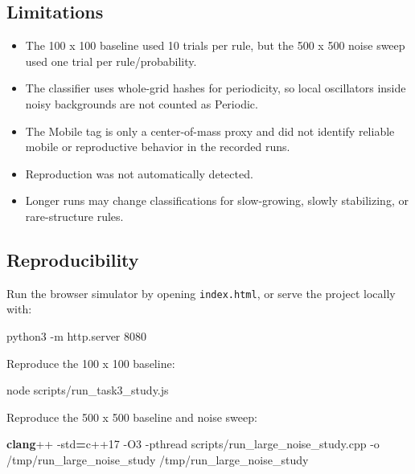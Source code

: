\documentclass[
]{article}
\newenvironment{Shaded}{\begin{snugshade}}{\end{snugshade}}
\newcommand{\AttributeTok}[1]{\textcolor[rgb]{0.13,0.29,0.53}{#1}}
\newcommand{\ExtensionTok}[1]{#1}
\newcommand{\FunctionTok}[1]{\textcolor[rgb]{0.13,0.29,0.53}{\textbf{#1}}}
\newcommand{\NormalTok}[1]{#1}
\newcommand{\OperatorTok}[1]{\textcolor[rgb]{0.81,0.36,0.00}{\textbf{#1}}}
\providecommand{\tightlist}{%
  \setlength{\itemsep}{0pt}\setlength{\parskip}{0pt}}
\begin{document}
\subsection{Limitations}\label{limitations}

\begin{itemize}
\tightlist
\item
  The 100 x 100 baseline used 10 trials per rule, but the 500 x 500
  noise sweep used one trial per rule/probability.
\item
  The classifier uses whole-grid hashes for periodicity, so local
  oscillators inside noisy backgrounds are not counted as Periodic.
\item
  The Mobile tag is only a center-of-mass proxy and did not identify
  reliable mobile or reproductive behavior in the recorded runs.
\item
  Reproduction was not automatically detected.
\item
  Longer runs may change classifications for slow-growing, slowly
  stabilizing, or rare-structure rules.
\end{itemize}

\subsection{Reproducibility}\label{reproducibility}

Run the browser simulator by opening \texttt{index.html}, or serve the
project locally with:

\begin{Shaded}
\begin{Highlighting}[]
\ExtensionTok{python3} \AttributeTok{{-}m}\NormalTok{ http.server 8080}
\end{Highlighting}
\end{Shaded}

Reproduce the 100 x 100 baseline:

\begin{Shaded}
\begin{Highlighting}[]
\ExtensionTok{node}\NormalTok{ scripts/run\_task3\_study.js}
\end{Highlighting}
\end{Shaded}

Reproduce the 500 x 500 baseline and noise sweep:

\begin{Shaded}
\begin{Highlighting}[]
\FunctionTok{clang}\NormalTok{++ }\AttributeTok{{-}std}\OperatorTok{=}\NormalTok{c++17 }\AttributeTok{{-}O3} \AttributeTok{{-}pthread}\NormalTok{ scripts/run\_large\_noise\_study.cpp }\AttributeTok{{-}o}\NormalTok{ /tmp/run\_large\_noise\_study}
\ExtensionTok{/tmp/run\_large\_noise\_study}
\end{Highlighting}
\end{Shaded}
\end{document}
